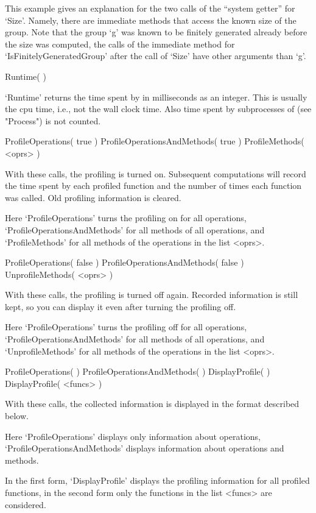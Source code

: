 This example gives an explanation for the two calls of the
``system getter'' for `Size'.
Namely, there are immediate methods that access the known size
of the group.
Note that the group `g' was known to be finitely generated already
before the size was computed,
the calls of the immediate method for `IsFinitelyGeneratedGroup'
after the call of `Size' have other arguments than `g'.



\>Runtime(  )

`Runtime' returns the time spent by {\GAP} in milliseconds as an integer.
This is usually the cpu time, i.e., not the wall clock time.
Also time spent by subprocesses of {\GAP} (see "Process") is not counted.



\>ProfileOperations( true )
\)ProfileOperationsAndMethods( true )
\)ProfileMethods( <oprs> )

With these calls, the profiling is turned on.
Subsequent computations will record the time spent by each profiled
function and the number of times each function was called.
Old profiling information is cleared.

Here `ProfileOperations' turns the profiling on for all operations,
`ProfileOperationsAndMethods' for all methods of all operations,
and `ProfileMethods' for all methods of the operations in the list
<oprs>.


\>ProfileOperations( false )
\)ProfileOperationsAndMethods( false )
\)UnprofileMethods( <oprs> )

With these calls, the profiling is turned off again.
Recorded information is still kept, so you can  display it even after
turning the profiling off.

Here `ProfileOperations' turns the profiling off for all operations,
`ProfileOperationsAndMethods' for all methods of all operations,
and `UnprofileMethods' for all methods of the operations in the list
<oprs>.


\>ProfileOperations(  )
\)ProfileOperationsAndMethods(  )
\)DisplayProfile(  )
\)DisplayProfile( <funcs> )

With these calls, the collected information is displayed in the format
described below.

Here `ProfileOperations' displays only information about operations,
`ProfileOperationsAndMethods' displays information about operations
and methods.

In the first form, `DisplayProfile' displays the profiling information
for all profiled functions,
in the second form only the functions in the list <funcs> are
considered.




